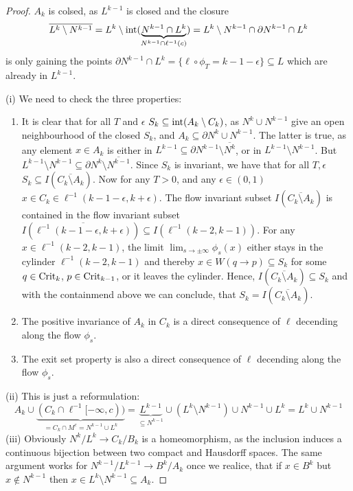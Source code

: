 \begin{proof}
	$A_k$ is colsed, as $L^{k-1}$ is closed and the closure 
	\begin{equation*}
		\overline{L^k\setminus N^{k-1}}=L^k\setminus \operatorname{\mathrm{int}}( \underbrace{N^{k-1} \cap L^k}_{N^{k-1}\cap \ell^{-1}(c)})=L^k\setminus N^{k-1}\cap \partial N^{k-1}\cap L^k
	\end{equation*} is only gaining the points $\partial N^{k-1}\cap L^k=\{\ell \circ \phi_T=k-1-\epsilon\}\subseteq L$ which are already in $L^{k-1}$. 
	
	(i) We need to check the three properties:
	\begin{enumerate}
		\item  It is clear that for all $T$ and $\epsilon$ $S_k\subseteq \operatorname{\mathrm{int}}(A_k \setminus C_k)$, as $N^k \cup N^{k-1}$ give an open neighbourhood of the closed $S_k$, and $A_k\subseteq \partial N^k\cup N^{k-1}$. The latter is true, as any element  $x\in A_k$ is either in $L^{k-1}\subseteq \partial N^{k-1}\setminus \overline{N^k}$, or in $L^{k-1}\setminus N^{k-1}$. But $L^{k-1}\setminus N^{k-1}\subseteq \partial N^k \setminus  \overline{N^{k-1}}$. Since $S_k$ is invariant, we have that for all $T,\epsilon$ $S_k\subseteq I(\overline{C_k\setminus A_k})$. Now for any $T>0$, and any $\epsilon \in (0,1)$ $x\in C_k\in \ell^{-1}(k-1-\epsilon,k+\epsilon)$. The flow invariant subset $I(\overline{C_k\setminus A_k})$ is contained in the flow invariant subset $I(\overline{\ell^{-1}(k-1-\epsilon,k+\epsilon)})\subseteq I(\ell^{-1}(k-2,k-1))$.
	For any $x\in \ell^{-1}(k-2,k-1)$, the limit $\lim_{s\to \pm \infty} \phi_s(x)$ either stays in the cylinder $\ell^{-1}(k-2,k-1)$ and thereby $x\in W(q\to p)\subseteq S_k$ for some $q\in \mathrm{Crit}_k$, $p\in \mathrm{Crit}_{k-1}$, or it leaves the cylinder. Hence, $I(\overline{C_k\setminus A_k}) \subseteq S_k$ and with the containmend above we can conclude, that $S_k=I(\overline{C_k\setminus A_k})$.
		\item  The positive invariance of $A_k$ in $C_k$ is a direct consequence of $\ell$ decending along the flow $\phi_s$.
		\item The exit set property is also a direct consequence of $\ell$ decending along the flow $\phi_s$.
	\end{enumerate}

	(ii) This is just a reformulation:
	\begin{equation*}
		A_k\cup \underbrace{(C_k\cap \ell^{-1}[-\infty,c))}_{=C_k\cap M^c=N^{k-1}\cup L^k}=\underbrace{L^{k-1}}_{\subseteq N^{k-1}}\cup (L^k\setminus N^{k-1})\cup N^{k-1} \cup L^k =L^k\cup N^{k-1}
	\end{equation*}
	(iii) Obviously $N^k/L^k \to C_k / B_k$ is a homeomorphism, as the inclusion induces a continuous bijection between two compact and Hausdorff spaces. The same argument works for $N^{k-1}/L^{k-1}\to B^k/ A_k$ once we realice, that if $x\in B^k$ but $x\notin N^{k-1}$ then $x\in L^k\setminus N^{k-1}\subseteq A_k$. 


\end{proof}
